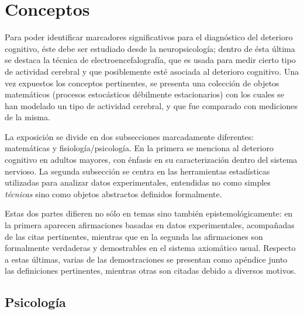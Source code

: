 
\section{Conceptos}

Para poder identificar marcadores significativos para el diagnóstico del deterioro cognitivo, 
éste debe ser estudiado desde la neuropsicología; dentro de ésta última se destaca la técnica de 
electroencefalografía, que es usada para medir cierto tipo de actividad cerebral y que posiblemente 
esté asociada al deterioro cognitivo. 
Una vez expuestos los conceptos pertinentes, se presenta una colección de objetos matemáticos
(procesos estocásticos débilmente estacionarios) con los cuales se han modelado un tipo de
actividad cerebral, y que fue comparado con mediciones de la misma.

La exposición se divide en dos subsecciones marcadamente diferentes: matemáticas y 
fisiología/psicología.
En la primera se menciona al deterioro cognitivo en adultos mayores, con énfasis en su 
caracterización dentro del sistema nervioso.
La segunda subsección se centra en las herramientas estadísticas utilizadas para analizar datos 
experimentales, entendidas no como simples \textit{técnicas} sino como objetos abstractos
definidos formalmente.

Estas dos partes difieren no sólo en temas sino también epistemológicamente: en la
primera aparecen afirmaciones basadas en datos experimentales, acompañadas de las citas 
pertinentes, mientras que en la segunda las
afirmaciones son formalmente verdaderas y demostrables en el sistema 
axiomático usual. Respecto a estas últimas, varias de las demostraciones se presentan como 
apéndice junto las definiciones pertinentes, mientras otras son citadas debido a diversos motivos.

\subsection{Psicología}


